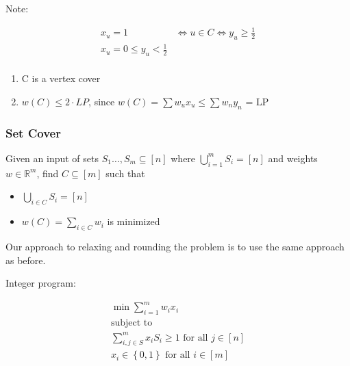 \documentclass[../notes.tex]{subfiles}
\begin{document}
Note:

\begin{equation}
    \begin{split}
        x_u = 1 &\Leftrightarrow u \in C \Leftrightarrow y_u \ge  \frac{1}{2} \\
        x_u = 0 \le  y_u < \frac{1}{2}\\
    \end{split}
    \label{eq:}
\end{equation}

\begin{enumerate}
    \item C is a vertex cover
    \item $ w(C) \le  2 \cdot  LP$, since $ w(C) = \sum w_u x_u \le \sum w_n y_n \text{ = LP } $
\end{enumerate}



\subsubsection{Set Cover}

Given an input of sets $ S_1 \ldots,  S_m \subseteq [n] $ where $ \bigcup^m_{i=1} S_i = [n]  $ and weights $ w \in \mathbb{R}^m $, find $ C \subseteq [m] $ such that

\begin{itemize}
    \item $ \bigcup_{i \in C} S_i = [n] $
    \item $ w(C) = \sum_{i \in C} w_i $ is minimized
\end{itemize}


Our approach to relaxing and rounding the problem is to use the same approach as before.

Integer program:

\begin{equation}
    \begin{split}
        \min \sum_{i=1}^m w_i x_i \\
        \text{subject to} \\
        \sum_{i, j \in S}^m x_i S_i \ge 1 \text{ for all } j \in [n] \\
        x_i \in \left\{ 0, 1 \right\} \text{ for all } i \in [m]
    \end{split}
\end{equation}
\end{document}
